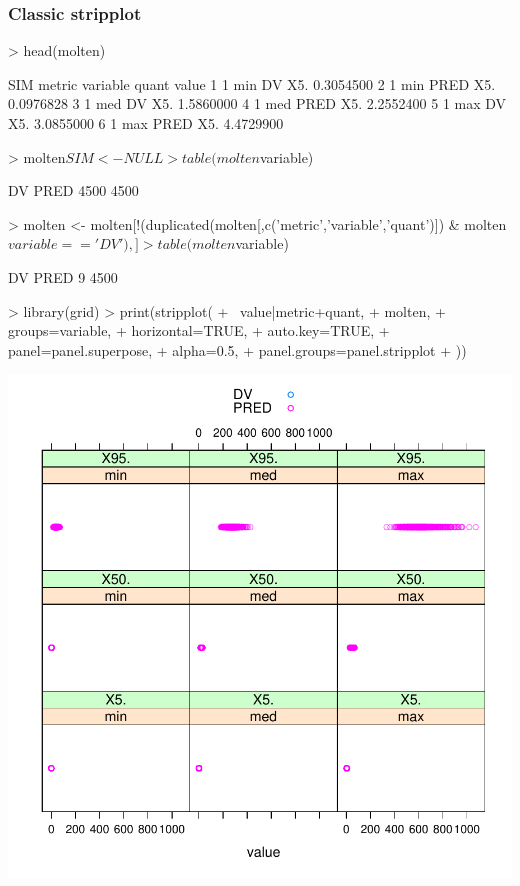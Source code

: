 \subsubsection{Classic stripplot}
\begin{Schunk}
\begin{Sinput}
> head(molten)
\end{Sinput}
\begin{Soutput}
  SIM metric variable quant     value
1   1    min       DV   X5. 0.3054500
2   1    min     PRED   X5. 0.0976828
3   1    med       DV   X5. 1.5860000
4   1    med     PRED   X5. 2.2552400
5   1    max       DV   X5. 3.0855000
6   1    max     PRED   X5. 4.4729900
\end{Soutput}
\begin{Sinput}
> molten$SIM <- NULL
> table(molten$variable)
\end{Sinput}
\begin{Soutput}
  DV PRED 
4500 4500 
\end{Soutput}
\begin{Sinput}
> molten <- molten[!(duplicated(molten[,c('metric','variable','quant')]) & molten$variable=='DV'),]
> table(molten$variable)
\end{Sinput}
\begin{Soutput}
  DV PRED 
   9 4500 
\end{Soutput}
\begin{Sinput}
> library(grid)
> print(stripplot(
+ 	~value|metric+quant,
+ 	molten,
+ 	groups=variable,
+ 	horizontal=TRUE,
+ 	auto.key=TRUE,
+ 	panel=panel.superpose,
+ 	alpha=0.5,
+ 	panel.groups=panel.stripplot
+ ))
\end{Sinput}
\end{Schunk}
\includegraphics{model1-stripplot}
